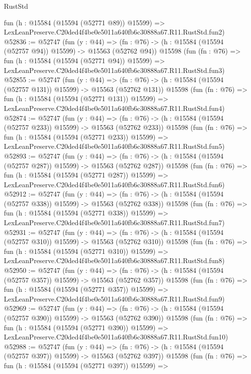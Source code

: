 \begin{lexlean}{RustStd}
\begin{coremodule}
    fun (h : @15584 (@15594 (@52771 @89)) @15599) =>
    LexLeanPreserve.C20ded4f4be0e5011a640fb6c30888a67.R11.RustStd.fun2)
@52836 := @52747
    (fun (y : @44) =>
    (fn : @76) -> (h : @15584 (@15594 (@52757 @94)) @15599) -> @15563 (@52762 @94))
    @15598
    (fun (fn : @76) =>
    fun (h : @15584 (@15594 (@52771 @94)) @15599) =>
    LexLeanPreserve.C20ded4f4be0e5011a640fb6c30888a67.R11.RustStd.fun3)
@52855 := @52747
    (fun (y : @44) =>
    (fn : @76) -> (h : @15584 (@15594 (@52757 @131)) @15599) -> @15563 (@52762 @131))
    @15598
    (fun (fn : @76) =>
    fun (h : @15584 (@15594 (@52771 @131)) @15599) =>
    LexLeanPreserve.C20ded4f4be0e5011a640fb6c30888a67.R11.RustStd.fun4)
@52874 := @52747
    (fun (y : @44) =>
    (fn : @76) -> (h : @15584 (@15594 (@52757 @233)) @15599) -> @15563 (@52762 @233))
    @15598
    (fun (fn : @76) =>
    fun (h : @15584 (@15594 (@52771 @233)) @15599) =>
    LexLeanPreserve.C20ded4f4be0e5011a640fb6c30888a67.R11.RustStd.fun5)
@52893 := @52747
    (fun (y : @44) =>
    (fn : @76) -> (h : @15584 (@15594 (@52757 @287)) @15599) -> @15563 (@52762 @287))
    @15598
    (fun (fn : @76) =>
    fun (h : @15584 (@15594 (@52771 @287)) @15599) =>
    LexLeanPreserve.C20ded4f4be0e5011a640fb6c30888a67.R11.RustStd.fun6)
@52912 := @52747
    (fun (y : @44) =>
    (fn : @76) -> (h : @15584 (@15594 (@52757 @338)) @15599) -> @15563 (@52762 @338))
    @15598
    (fun (fn : @76) =>
    fun (h : @15584 (@15594 (@52771 @338)) @15599) =>
    LexLeanPreserve.C20ded4f4be0e5011a640fb6c30888a67.R11.RustStd.fun7)
@52931 := @52747
    (fun (y : @44) =>
    (fn : @76) -> (h : @15584 (@15594 (@52757 @310)) @15599) -> @15563 (@52762 @310))
    @15598
    (fun (fn : @76) =>
    fun (h : @15584 (@15594 (@52771 @310)) @15599) =>
    LexLeanPreserve.C20ded4f4be0e5011a640fb6c30888a67.R11.RustStd.fun8)
@52950 := @52747
    (fun (y : @44) =>
    (fn : @76) -> (h : @15584 (@15594 (@52757 @357)) @15599) -> @15563 (@52762 @357))
    @15598
    (fun (fn : @76) =>
    fun (h : @15584 (@15594 (@52771 @357)) @15599) =>
    LexLeanPreserve.C20ded4f4be0e5011a640fb6c30888a67.R11.RustStd.fun9)
@52969 := @52747
    (fun (y : @44) =>
    (fn : @76) -> (h : @15584 (@15594 (@52757 @390)) @15599) -> @15563 (@52762 @390))
    @15598
    (fun (fn : @76) =>
    fun (h : @15584 (@15594 (@52771 @390)) @15599) =>
    LexLeanPreserve.C20ded4f4be0e5011a640fb6c30888a67.R11.RustStd.fun10)
@52988 := @52747
    (fun (y : @44) =>
    (fn : @76) -> (h : @15584 (@15594 (@52757 @397)) @15599) -> @15563 (@52762 @397))
    @15598
    (fun (fn : @76) =>
    fun (h : @15584 (@15594 (@52771 @397)) @15599) =>

\end{coremodule}
\end{lexlean}
